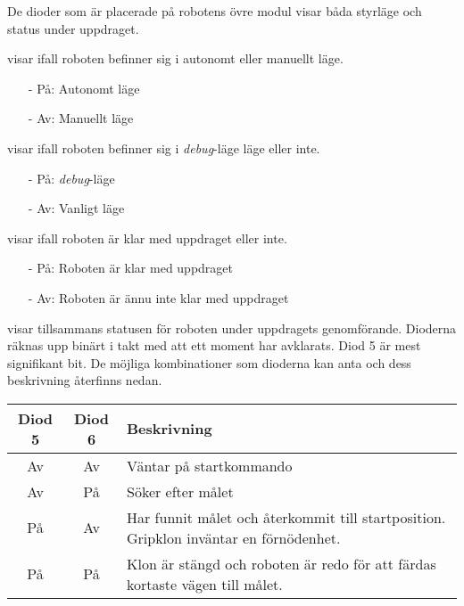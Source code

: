 \documentclass[11pt]{article}
\begin{document}
De dioder som är placerade på robotens övre modul visar båda styrläge och status under uppdraget.
\begin{description}[style=unboxed, leftmargin=0cm]
  \item[Diod 1] visar ifall roboten befinner sig i autonomt eller manuellt läge. 
    \begin{itemize}
      \setlength\itemsep{-0.5em}
      \item[-] På: Autonomt läge 
      \item[-] Av: Manuellt läge
    \end{itemize}
  \item[Diod 2] visar ifall roboten befinner sig i \textit{debug}-läge läge eller inte.
    \begin{itemize}
      \setlength\itemsep{-0.5em}
      \item[-] På: \textit{debug}-läge
      \item[-] Av: Vanligt läge
    \end{itemize}
  \item[Diod 3] visar ifall roboten är klar med uppdraget eller inte.
    \begin{itemize}
      \setlength\itemsep{-0.5em}
      \item[-] På: Roboten är klar med uppdraget
      \item[-] Av: Roboten är ännu inte klar med uppdraget
    \end{itemize}
  \item[Diod 4 och 5] visar tillsammans statusen för roboten under uppdragets genomförande. Dioderna räknas upp binärt i takt med att ett moment har avklarats. Diod 5 är mest signifikant bit. De möjliga kombinationer som dioderna kan anta och dess beskrivning återfinns nedan.

    \hspace{2em}\begin{tabular}{c c p{8cm}}
	Diod 5 & Diod 6 & Beskrivning \\ \hline
	Av & Av & Väntar på startkommando \\
	Av & På & Söker efter målet \\
	På & Av & Har funnit målet och återkommit till startposition. Gripklon inväntar en förnödenhet. \\
	På & På & Klon är stängd och roboten är redo för att färdas kortaste vägen till målet.

    \end{tabular}
\end{description}
\end{document}
